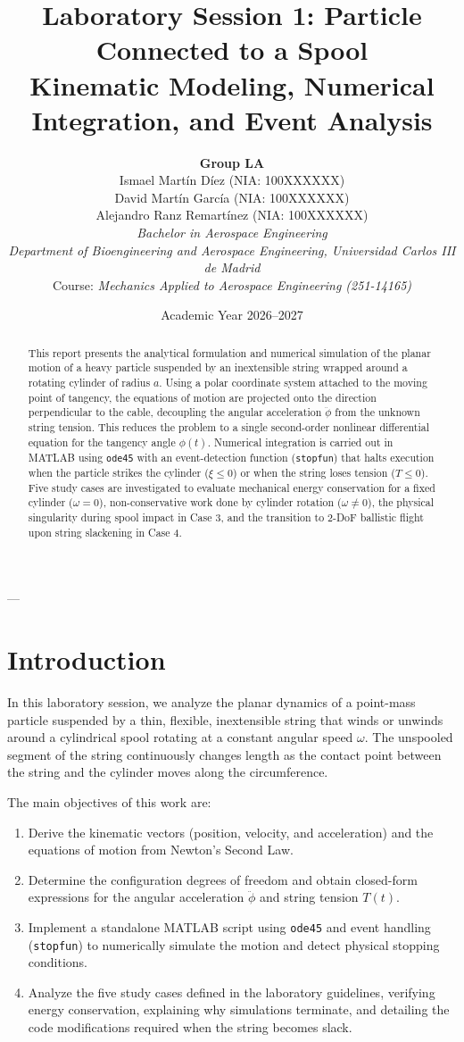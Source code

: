 \documentclass[11pt,a4paper]{article}
\title{\vspace{-1.5cm}
    \textbf{\Large Laboratory Session 1: Particle Connected to a Spool} \\
    \large Kinematic Modeling, Numerical Integration, and Event Analysis
}
\author{
    \textbf{Group LA} \\[0.5em]
    \small Ismael Mart\'in D\'iez \quad (NIA: 100XXXXXX) \\
    \small David Mart\'in Garc\'ia \quad (NIA: 100XXXXXX) \\
    \small Alejandro Ranz Remart\'inez \quad (NIA: 100XXXXXX) \\[0.5em]
    \small \textit{Bachelor in Aerospace Engineering} \\
    \small \textit{Department of Bioengineering and Aerospace Engineering, Universidad Carlos III de Madrid} \\
    \small Course: \textit{Mechanics Applied to Aerospace Engineering (251-14165)}
}
\date{Academic Year 2026--2027}
\begin{document}
\maketitle

\begin{abstract}
This report presents the analytical formulation and numerical simulation of the planar motion of a heavy particle suspended by an inextensible string wrapped around a rotating cylinder of radius $a$. Using a polar coordinate system attached to the moving point of tangency, the equations of motion are projected onto the direction perpendicular to the cable, decoupling the angular acceleration $\ddot{\phi}$ from the unknown string tension. This reduces the problem to a single second-order nonlinear differential equation for the tangency angle $\phi(t)$. Numerical integration is carried out in MATLAB using \texttt{ode45} with an event-detection function (\texttt{stopfun}) that halts execution when the particle strikes the cylinder ($\xi \le 0$) or when the string loses tension ($T \le 0$). Five study cases are investigated to evaluate mechanical energy conservation for a fixed cylinder ($\omega = 0$), non-conservative work done by cylinder rotation ($\omega \neq 0$), the physical singularity during spool impact in Case 3, and the transition to 2-DoF ballistic flight upon string slackening in Case 4.
\end{abstract}

---

\section{Introduction}

In this laboratory session, we analyze the planar dynamics of a point-mass particle suspended by a thin, flexible, inextensible string that winds or unwinds around a cylindrical spool rotating at a constant angular speed $\omega$. The unspooled segment of the string continuously changes length as the contact point between the string and the cylinder moves along the circumference. 

The main objectives of this work are:
\begin{enumerate}
    \item Derive the kinematic vectors (position, velocity, and acceleration) and the equations of motion from Newton's Second Law.
    \item Determine the configuration degrees of freedom and obtain closed-form expressions for the angular acceleration $\ddot{\phi}$ and string tension $T(t)$.
    \item Implement a standalone MATLAB script using \texttt{ode45} and event handling (\texttt{stopfun}) to numerically simulate the motion and detect physical stopping conditions.
    \item Analyze the five study cases defined in the laboratory guidelines, verifying energy conservation, explaining why simulations terminate, and detailing the code modifications required when the string becomes slack.
\end{enumerate}
\end{document}
